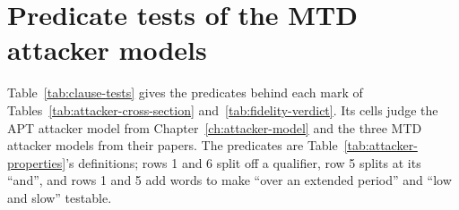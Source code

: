 \documentclass{cshonours}
\begin{document}
\chapter{Predicate tests of the MTD attacker models}
\label{app:clause-tests}

Table~\ref{tab:clause-tests} gives the predicates behind each mark of
Tables~\ref{tab:attacker-cross-section} and~\ref{tab:fidelity-verdict}. Its
cells judge the APT attacker model from Chapter~\ref{ch:attacker-model} and the
three MTD attacker models from their papers. The predicates are Table~\ref{tab:attacker-properties}'s
definitions; rows 1 and 6 split off a qualifier, row 5 splits at
its ``and'', and rows 1 and 5 add words to make ``over an extended period''
and ``low and slow'' testable.
\end{document}
